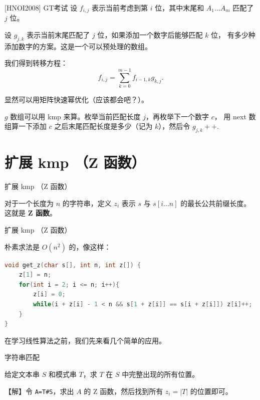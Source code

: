 \documentclass{beamer}
\begin{document}
\begin{frame}{[HNOI2008] GT考试}
    \small 
    设 $f_{i,j}$ 表示当前考虑到第 $i$ 位，其中末尾和 $A_1...A_m$ 匹配了 $j$ 位。

    设 $g_{j,k}$ 表示当前末尾匹配了 $j$ 位，如果添加一个数字后能够匹配 $k$ 位，
    有多少种添加数字的方案。这是一个可以预处理的数组。

    \vspace{1em}\pause
    我们得到转移方程：
    \begin{equation*}
        f_{i,j}=\sum_{k=0}^{m-1} f_{i-1,k}g_{k,j}.
    \end{equation*}

    显然可以用矩阵快速幂优化（应该都会吧？）。

    \vspace{1em}\pause
    $g$ 数组可以用 kmp 来算。枚举当前匹配长度 $j$，再枚举下一个数字 $c$，
    用 next 数组算一下添加 $c$ 之后末尾匹配长度是多少（记为 $k$），然后令 $g_{j,k}++$.
\end{frame}

\section{扩展 kmp （Z 函数）}

\begin{frame}{扩展 kmp （Z 函数）}
    \small

    对于一个长度为 $n$ 的字符串，定义 $z_i$ 表示 $s$ 与 $s[i...n]$ 的最长公共前缀长度。
    这就是 \textbf{Z 函数}。
\end{frame}

\begin{frame}[fragile]{扩展 kmp （Z 函数）}
    \small

    朴素求法是 $O(n^2)$ 的，像这样：

    \begin{lstlisting}[language=c++]
void get_z(char s[], int n, int z[]) {
    z[1] = n;
    for(int i = 2; i <= n; i++){
        z[i] = 0;
        while(i + z[i] - 1 < n && s[1 + z[i]] == s[i + z[i]]) z[i]++;
    }
}
    \end{lstlisting}

    在学习线性算法之前，我们先来看几个简单的应用。
\end{frame}

\begin{frame}[fragile]{字符串匹配}
    \small

    给定文本串 $S$ 和模式串 $T$，求 $T$ 在 $S$ 中完整出现的所有位置。

    \pause\vspace{1em}
    【解】令 \verb|A=T#S|，求出 $A$ 的 Z 函数，然后找到所有 $z_i=|T|$ 的位置即可。
\end{frame}
\end{document}
